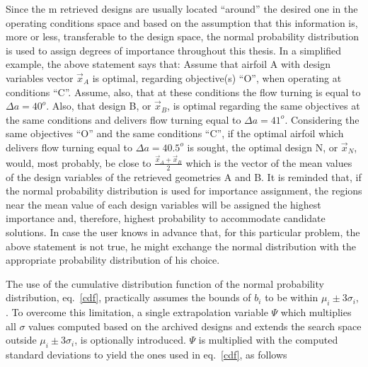  

%

Since the m retrieved designs are usually located ``around'' the desired one in the operating conditions space and based on the assumption that this information is, more or less, transferable to the design space, the  normal probability distribution is used to assign degrees of importance throughout this thesis. In a simplified example, the above statement says that: Assume that airfoil A with design variables vector $\vec{x}_A$ is optimal, regarding objective(s) ``O'', when operating at conditions ``C''. Assume, also, that at these conditions the flow turning is equal to $\Delta a\!=\!40^o$. Also,  that design B, or $\vec{x}_B$,  is optimal regarding the same objectives at the same conditions and delivers flow turning equal to $\Delta a \!=\!41^o$. Considering the same objectives ``O'' and the same conditions ``C'', if the optimal airfoil which delivers flow turning equal to $\Delta a\!=\!40.5^o$ is sought, the optimal design N, or $\vec{x}_N$, would, most probably, be close to  $\frac{\vec{x}_A+\vec{x}_B}{2}$ which is the vector of the mean values of the design variables of the retrieved geometries A and B. It is reminded that, if the normal probability distribution is used for importance assignment, the regions near the mean value of each design variables will be assigned the highest importance and, therefore, highest probability to accommodate candidate solutions. In case the user knows in advance that, for this particular problem, the above statement is not true, he might exchange the normal distribution with the appropriate probability distribution of his choice.           

The use of the cumulative distribution function of the normal probability distribution, eq.\ \ref{cdf}, practically assumes the bounds of $b_i$ to be within $\mu _i \pm 3\sigma _i$, \cite{Kiemele}. To overcome this limitation, a single extrapolation variable $\Psi$ which multiplies all $\sigma$ values computed based on the archived designs and extends the search space outside $\mu _i \pm 3\sigma _i$, is optionally introduced. $\Psi$ is multiplied with the computed standard deviations to yield the ones used in eq.\ \ref{cdf}, as follows


